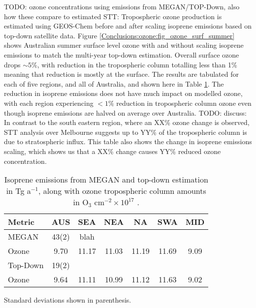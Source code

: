   TODO: ozone concentrations using emissions from MEGAN/TOP-Down, also how these compare to estimated STT:
  Tropospheric ozone production is estimated using GEOS-Chem before and after scaling isoprene emissions based on top-down satellite data.
  Figure \ref{Conclusions:ozone:fig_ozone_surf_summer} shows Australian summer surface level ozone with and without scaling isoprene emissions to match the multi-year top-down estimation.
  Overall surface ozone drops $\sim 5\%$, with reduction in the tropospheric column totalling less than 1\% meaning that reduction is mostly at the surface.%
  The results are tabulated for each of five regions, and all of Australia, and shown here in Table \ref{Conclusions:ozone:tab_emissions_vs_ozone}.
  The reduction in isoprene emissions does not have much impact on modelled ozone, with each region experiencing $< 1\%$ reduction in tropospheric column ozone even though isoprene emissions are halved on average over Australia.
  TODO: discuss: In contrast to the south eastern region, where an XX\% ozone change is observed, STT analysis over Melbourne suggests up to YY\% of the tropospheric column is due to stratospheric influx.
  This table also shows the change in isoprene emissions scaling, which shows us that a XX\% change causes YY\% reduced ozone concentration.
  
  
  \begin{table}\begin{threeparttable}
    \caption{Isoprene emissions from MEGAN and top-down estimation in Tg a$^{-1}$, along with ozone tropospheric column amounts in O$_3$ cm$^{-2} \times 10^{17}$ .}
    \begin{tabular}{ l c c c c c c } 
      \toprule
      Metric & AUS & SEA & NEA & NA & SWA & MID \\
      \midrule
      MEGAN & 43(2) & blah &  &  & & \\
      Ozone & 9.70 & 11.17 & 11.03 & 11.19 & 11.69 & 9.09 \\
      \midrule
      Top-Down & 19(2) & & & & & \\
      Ozone & 9.64 & 11.11 & 10.99 & 11.12 & 11.63 & 9.02 \\
      \bottomrule
    \end{tabular}
    \begin{tablenotes}
      \item Standard deviations shown in parenthesis.
    \end{tablenotes}
    \label{Conclusions:ozone:tab_emissions_vs_ozone}
  \end{threeparttable}\end{table}


